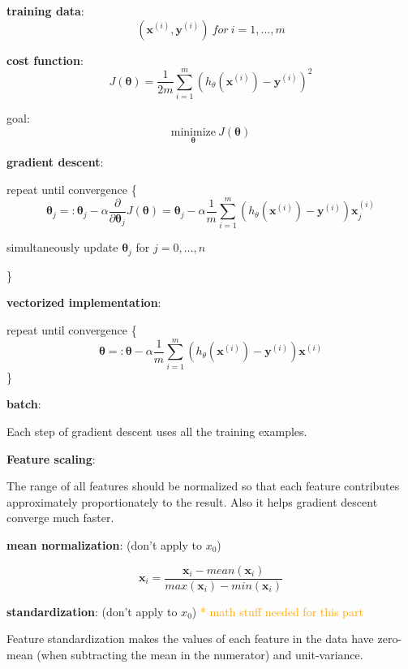 \documentclass{article}
\begin{document}
\noindent \textbf{training data}:
\[(\textbf{x}^{(i)}, \textbf{y}^{(i)})\:for\:i = 1, \dots, m\]

\noindent \textbf{cost function}:
\[J(\boldsymbol{\theta}) = \frac{1}{2m} \sum_{i = 1}^m (h_{\theta}(\textbf{x}^{(i)}) - \textbf{y}^{(i)})^2\]

\noindent goal:
\[\underset{\boldsymbol{\theta}}{\text{minimize}} \: J(\boldsymbol{\theta})\]

\noindent \textbf{gradient descent}:

\noindent repeat until convergence \{
\[\boldsymbol{\theta}_j =: \boldsymbol{\theta}_j - \alpha \frac{\partial}{\partial \boldsymbol{\theta}_j} J(\boldsymbol{\theta}) = \boldsymbol{\theta}_j - \alpha \frac{1}{m} \sum_{i = 1}^m (h_{\theta}(\textbf{x}^{(i)}) - \textbf{y}^{(i)}) \textbf{x}^{(i)}_j\]
\centerline{simultaneously update \(\boldsymbol{\theta}_j\) for \(j = 0, \dots, n\)}
\}

\bigskip

\noindent \textbf{vectorized implementation}:

\noindent repeat until convergence \{
\[\boldsymbol{\theta} =: \boldsymbol{\theta} - \alpha \frac{1}{m} \sum_{i = 1}^m (h_{\theta}(\textbf{x}^{(i)}) - \textbf{y}^{(i)}) \textbf{x}^{(i)}\]
\}

\bigskip

\noindent \textbf{batch}:

\noindent Each step of gradient descent uses all the training examples.

\bigskip

\noindent \textbf{Feature scaling}:

\noindent The range of all features should be normalized so that each feature contributes approximately proportionately to the result. Also it helps gradient descent converge much faster.

\bigskip

\noindent \textbf{mean normalization}: (don't apply to \(x_0\))

\[\textbf{x}_i = \frac{\textbf{x}_i - mean(\textbf{x}_i)}{max(\textbf{x}_i) - min(\textbf{x}_i)}\]

\bigskip

\noindent \textbf{standardization}: (don't apply to \(x_0\)) \textcolor{orange}{ * math stuff needed for this part}

\noindent Feature standardization makes the values of each feature in the data have zero-mean (when subtracting the mean in the numerator) and unit-variance.
\end{document}
